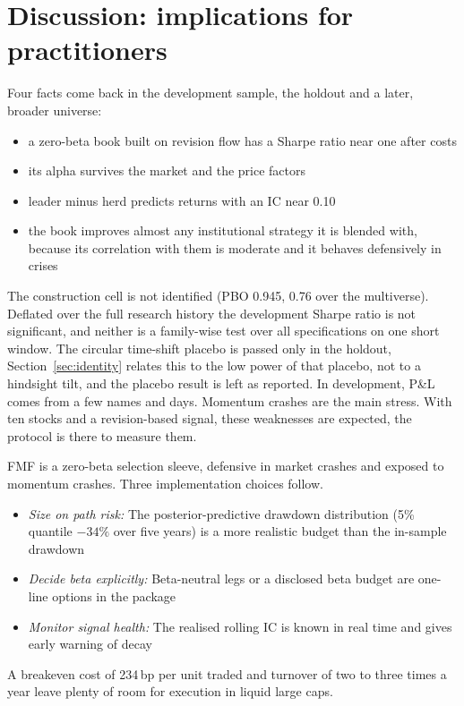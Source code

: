 \section{Discussion: implications for practitioners}\label{sec:discussion}

 Four facts come back in the development sample, the holdout and a later, broader universe:
\begin{itemize}
  \item a zero-beta book built on revision flow has a Sharpe ratio near one after costs
  \item its alpha survives the market and the price factors
  \item leader minus herd predicts returns with an IC near 0.10
  \item the book improves almost any institutional strategy it is blended with, because its correlation with them is moderate and it behaves defensively in crises
\end{itemize}

 The construction cell is not identified (PBO 0.945, 0.76 over the multiverse). Deflated over the full research history the development Sharpe ratio is not significant, and neither is a family-wise test over all specifications on one short window. The circular time-shift placebo is passed only in the holdout, Section~\ref{sec:identity} relates this to the low power of that placebo, not to a hindsight tilt, and the placebo result is left as reported. In development, P\&L comes from a few names and days. Momentum crashes are the main stress. With ten stocks and a revision-based signal, these weaknesses are expected, the protocol is there to measure them.

 FMF is a zero-beta selection sleeve, defensive in market crashes and exposed to momentum crashes. Three implementation choices follow.
\begin{itemize}
  \item \emph{Size on path risk:} The posterior-predictive drawdown distribution (5\% quantile $-34\%$ over five years) is a more realistic budget than the in-sample drawdown
  \item \emph{Decide beta explicitly:} Beta-neutral legs or a disclosed beta budget are one-line options in the package
  \item \emph{Monitor signal health:} The realised rolling IC is known in real time and gives early warning of decay
\end{itemize}
A breakeven cost of 234\,bp per unit traded and turnover of two to three times a year leave plenty of room for execution in liquid large caps.

